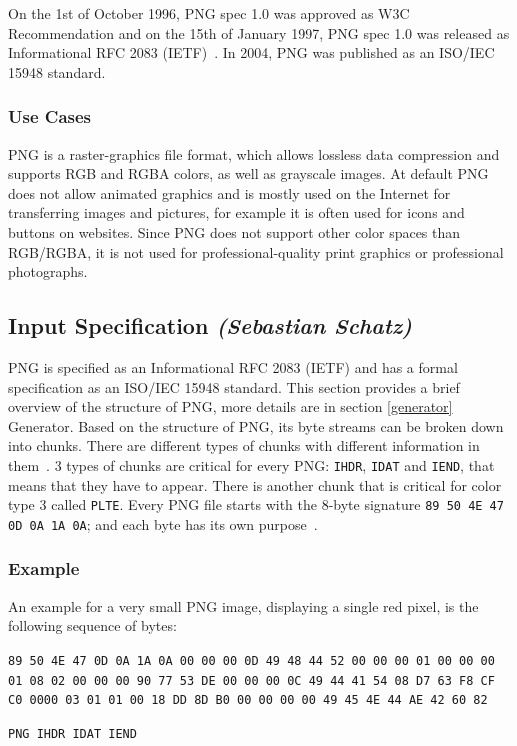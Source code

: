 \documentclass[runningheads]{llncs}
\begin{document}
On the 1st of October 1996, PNG spec 1.0 was approved as W3C
Recommendation and on the 15th of January 1997, PNG spec 1.0 was released as
Informational RFC 2083 (IETF)~\cite{PNG_specification}. In 2004, PNG was published as an ISO/IEC 15948
standard.

\subsubsection{Use Cases}
PNG is a raster-graphics file format, which allows lossless data compression and
supports RGB and RGBA colors, as well as grayscale images. At default PNG does not allow
animated graphics and is mostly used on the Internet for transferring images and
pictures, for example it is often used for icons and buttons on websites.
Since PNG does not support other color spaces than RGB/RGBA, it is not used for
professional-quality print graphics or professional photographs.

\subsection{Input Specification  \normalfont\textit{(Sebastian Schatz)}}
PNG is specified as an Informational RFC 2083 (IETF) and has a formal specification as
an ISO/IEC 15948 standard.
This section provides a brief overview of the structure of PNG, more details are in
section \ref{generator} Generator. Based on the structure of PNG, its byte streams can be broken
down into chunks. There are different types of chunks with different information in
them~\cite{libpng_chunks}. 3 types of chunks are critical for every PNG: \texttt{IHDR}, \texttt{IDAT} and \texttt{IEND}, that means
that they have to appear. There is another chunk that is critical for color type 3 called
\texttt{PLTE}. Every PNG file starts with the 8-byte signature \texttt{89 50 4E 47 0D 0A 1A 0A};
and each byte has its own purpose~\cite{libpng_rationale}.

\subsubsection{Example}
An example for a very small PNG image, displaying a single red pixel, is the following sequence of bytes:

\begin{center}
    \texttt{\color{NavyBlue}89 50 4E 47 0D 0A \color{PineGreen}1A 0A 00 00 00 0D 49 48 44 52 00 00 00 01 00 00 00 01 08 02
00 00 00 90 77 53 \color{Violet}DE 00 00 00 0C 49 44 41 54 08 D7 63 F8 CF C0 0000 03 01 01 00
18 DD 8D B0 \color{Plum}00 00 00 00 49 45 4E 44 AE 42 60 82}

\texttt{\color{NavyBlue}PNG \color{PineGreen}IHDR \color{Violet}IDAT \color{Plum}IEND}
\end{center}
\end{document}
